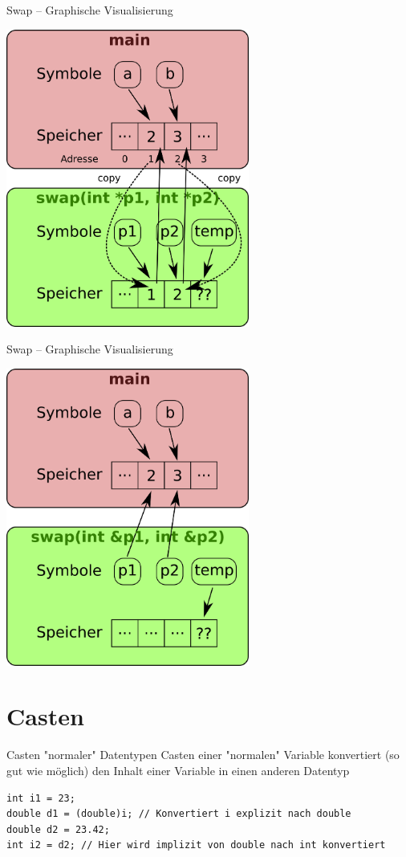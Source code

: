 \documentclass[presentation]{beamer}
\begin{document}
\begin{frame}[label={sec:orgb83cafa}]{Swap -- Graphische Visualisierung}
\begin{center}
\includegraphics[width=0.6\textwidth]{img/swap_point.png}
\end{center}
\end{frame}
\begin{frame}[label={sec:org76537b7}]{Swap -- Graphische Visualisierung}
\begin{center}
\includegraphics[width=0.6\textwidth]{img/swap_ref.png}
\end{center}
\end{frame}
\section{Casten}
\label{sec:org535d0d9}
\begin{frame}[label={sec:org40f7e52},fragile]{Casten "normaler" Datentypen}
 Casten einer "normalen" Variable konvertiert (so gut wie möglich) den
Inhalt einer Variable in einen anderen Datentyp
\begin{verbatim}
int i1 = 23;
double d1 = (double)i; // Konvertiert i explizit nach double
double d2 = 23.42;
int i2 = d2; // Hier wird implizit von double nach int konvertiert
\end{verbatim}
\end{frame}
\end{document}
